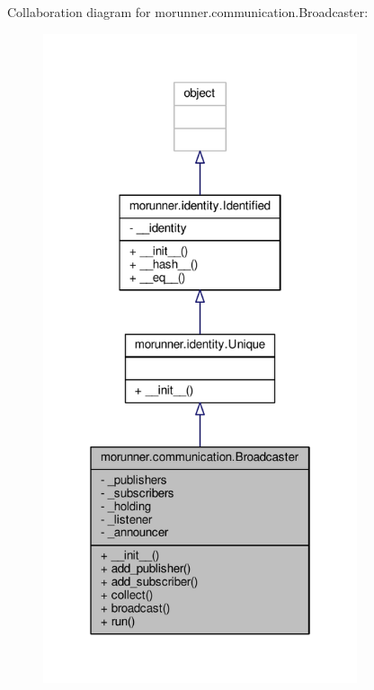 Collaboration diagram for morunner.\+communication.\+Broadcaster\+:
\nopagebreak
\begin{figure}[H]
\begin{center}
\leavevmode
\includegraphics[width=262pt]{classmorunner_1_1communication_1_1Broadcaster__coll__graph}
\end{center}
\end{figure}
